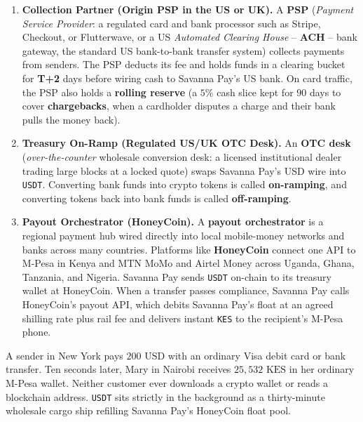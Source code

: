 \begin{enumerate}
  \item \textbf{Collection Partner (Origin PSP in the US or UK).} A \textbf{PSP} (\emph{Payment Service Provider}: a regulated card and bank processor such as Stripe, Checkout, or Flutterwave, or a US \emph{Automated Clearing House} -- \textbf{ACH} -- bank gateway, the standard US bank-to-bank transfer system) collects payments from senders. The PSP deducts its fee and holds funds in a clearing bucket for \textbf{T+2} days before wiring cash to Savanna Pay's US bank. On card traffic, the PSP also holds a \textbf{rolling reserve} (a $5\%$ cash slice kept for $90$ days to cover \textbf{chargebacks}, when a cardholder disputes a charge and their bank pulls the money back).
  \item \textbf{Treasury On-Ramp (Regulated US/UK OTC Desk).} An \textbf{OTC desk} (\emph{over-the-counter} wholesale conversion desk: a licensed institutional dealer trading large blocks at a locked quote) swaps Savanna Pay's USD wire into \texttt{USDT}. Converting bank funds into crypto tokens is called \textbf{on-ramping}, and converting tokens back into bank funds is called \textbf{off-ramping}.
  \item \textbf{Payout Orchestrator (HoneyCoin).} A \textbf{payout orchestrator} is a regional payment hub wired directly into local mobile-money networks and banks across many countries. Platforms like \textbf{HoneyCoin} connect one API to M-Pesa in Kenya and MTN MoMo and Airtel Money across Uganda, Ghana, Tanzania, and Nigeria. Savanna Pay sends \texttt{USDT} on-chain to its treasury wallet at HoneyCoin. When a transfer passes compliance, Savanna Pay calls HoneyCoin's payout API, which debits Savanna Pay's float at an agreed shilling rate plus rail fee and delivers instant \texttt{KES} to the recipient's M-Pesa phone.
\end{enumerate}

\begin{happeningbox}
A sender in New York pays $200\text{ USD}$ with an ordinary Visa debit card or bank transfer. Ten seconds later, Mary in Nairobi receives $25{,}532\text{ KES}$ in her ordinary M-Pesa wallet. Neither customer ever downloads a crypto wallet or reads a blockchain address. \texttt{USDT} sits strictly in the background as a thirty-minute wholesale cargo ship refilling Savanna Pay's HoneyCoin float pool.
\end{happeningbox}

